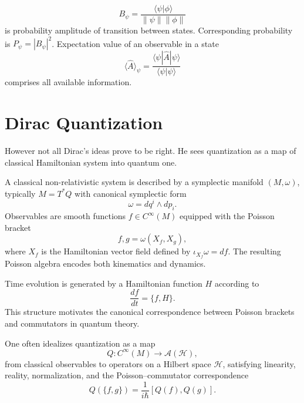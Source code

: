 \begin{axiom}
    \label{born-rule}
    \[  B_\psi=\frac{\langle{\psi}|{\phi}\rangle}{\|{\psi}\| \|{\phi}\|}  \]
     is probability amplitude of transition between states. Corresponding 
     probability is $ P_\psi=|B_\psi|^2 $.
    Expectation value of an observable in a state 
    \begin{equation}
       \label {exp1}
    \langle \hat A \rangle_\psi = \frac{\langle \psi| \hat A |\psi \rangle} {\langle \psi|\psi \rangle}
    \end{equation}
    comprises all available information.
\end{axiom}

\section{Dirac Quantization}
\label{dirac-quantization}
However  not all Dirac's ideas prove to be right. He sees
quantization as a map of classical Hamiltonian system into
quantum one.

A classical non-relativistic system is described by a symplectic manifold $(M,\omega)$, 
typically $M=T^*Q$ with canonical symplectic form
\begin{equation}
\omega = dq^i \wedge dp_i.
\end{equation}
Observables are smooth functions $f \in C^\infty(M)$ equipped with the Poisson bracket
\begin{equation}
{f,g} = \omega(X_f,X_g),
\end{equation}
where $X_f$ is the Hamiltonian vector field defined by $\iota_{X_f}\omega = df$. 
The resulting Poisson algebra encodes both kinematics and dynamics.

Time evolution is generated by a Hamiltonian function $H$ according to
\begin{equation}
\frac{df}{dt} = \{f,H\}.
\end{equation}
This structure motivates the canonical correspondence between Poisson brackets and 
commutators in quantum theory.

One often idealizes quantization as a map
\begin{equation}
Q : C^\infty(M) \to \mathcal{A}(\mathcal{H}),
\end{equation}
from classical observables to operators on a Hilbert space $\mathcal{H}$, satisfying 
linearity, reality, normalization, and the Poisson--commutator correspondence
\begin{equation}
    \label{oqm:pcc}
Q(\{f,g\}) = \frac{1}{i\hbar}[Q(f),Q(g)].
\end{equation}

